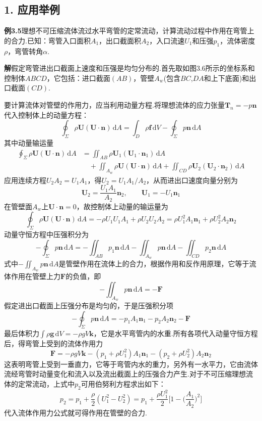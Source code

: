 \subsection*{1. 应用举例}

\noindent\textbf{例3.5}\quad 理想不可压缩流体流过水平弯管的定常流动，计算流动过程中作用在弯管上的合力.已知：弯管入口面积$A_1$，出口截面积$A_2$，入口流速$U_1$和压强$p_1$，流体密度$\rho$，弯管转角$\alpha$.

\noindent\textbf{解}\quad 假定弯管进出口截面上速度和压强是均匀分布的.首先取如图3.6所示的坐标系和控制体$ABCD$，它包括：进口截面$(AB)$，管壁$A_w$(包含$BC$,$DA$和上下底面)和出口截面$(CD)$.

要计算流体对管壁的作用力，应当利用动量方程.将理想流体的应力张量$\boldsymbol{T}_n=-p\boldsymbol{n}$代入控制体上的动量方程：
\[
\oint_\Sigma \rho\boldsymbol{U}(\boldsymbol{U}\cdot\boldsymbol{n})\,\mathrm{d}A=\int_D \rho\boldsymbol{f}\,\mathrm{d}V-\oint_\Sigma p\boldsymbol{n}\,\mathrm{d}A
\]
其中动量输运量
\begin{align*}
\oint_\Sigma \rho\boldsymbol{U}(\boldsymbol{U}\cdot\boldsymbol{n})\,\mathrm{d}A&=\iint_{AB}\rho\boldsymbol{U}_1(\boldsymbol{U}_1\cdot\boldsymbol{n}_1)\,\mathrm{d}A\\
&\quad+\iint_{A_w}\rho\boldsymbol{U}(\boldsymbol{U}\cdot\boldsymbol{n})\,\mathrm{d}A+\iint_{CD}\rho\boldsymbol{U}_2(\boldsymbol{U}_2\cdot\boldsymbol{n}_2)\,\mathrm{d}A
\end{align*}
应用连续方程$U_2A_2=U_1A_1$，得$U_2=U_1A_1/A_2$，从而进出口速度向量分别为
\[
\boldsymbol{U}_2=\frac{U_1A_1}{A_2}\boldsymbol{n}_2,\qquad \boldsymbol{U}_1=-U_1\boldsymbol{n}_1
\]
在管壁面$A_w$上$\boldsymbol{U}\cdot\boldsymbol{n}=0$，故控制体上动量的输运量为
\[
\oint_\Sigma \rho\boldsymbol{U}(\boldsymbol{U}\cdot\boldsymbol{n})\,\mathrm{d}A=-\rho U_1U_1A_1+\rho U_2U_2A_2=\rho U_1^{2}A_1\boldsymbol{n}_1+\rho U_2^{2}A_2\boldsymbol{n}_2
\]
动量守恒方程中压强积分为
\[
-\oint_\Sigma p\boldsymbol{n}\,\mathrm{d}A=-\iint_{AB}p_1\boldsymbol{n}\,\mathrm{d}A-\iint_{A_w}p\boldsymbol{n}\,\mathrm{d}A-\iint_{CD}p_2\boldsymbol{n}\,\mathrm{d}A
\]
式中$-\displaystyle\iint_{A_w}p\boldsymbol{n}\,\mathrm{d}A$是管壁作用在流体上的合力，根据作用和反作用原理，它等于流体作用在管壁上力$\boldsymbol{F}$的负值，即
\[
-\iint_{A_w}p\boldsymbol{n}\,\mathrm{d}A=-\boldsymbol{F}
\]
假定进出口截面上压强分布是均匀的，于是压强积分项
\[
-\oint_\Sigma p\boldsymbol{n}\,\mathrm{d}A=-p_1A_1\boldsymbol{n}_1-p_2A_2\boldsymbol{n}_2-\boldsymbol{F}
\]
最后体积力$\displaystyle\int\rho\boldsymbol{g}\,\mathrm{d}V=-\rho gV\boldsymbol{k}$，它是水平弯管内的水重.所有各项代入动量守恒方程后，得弯管上受到的流体作用力
\[
\boldsymbol{F}=-\rho gV\boldsymbol{k}-(p_1+\rho U_1^{2})A_1\boldsymbol{n}_1-(p_2+\rho U_2^{2})A_2\boldsymbol{n}_2
\]
这表明弯管上受到一垂直力，它等于弯管内水的重力，另外有一水平力，它由流体流经弯管时动量变化和流入以及流出截面上的压强合力产生.对于不可压缩理想流体的定常流动，上式中$p_2$可用伯努利方程求出如下：
\[
p_2=p_1+\frac{\rho}{2}(U_1^{2}-U_2^{2})=p_1+\frac{\rho U_1^{2}}{2}\Big[1-\Big(\frac{A_1}{A_2}\Big)^{2}\Big]
\]
代入流体作用力公式就可得作用在管壁的合力.

